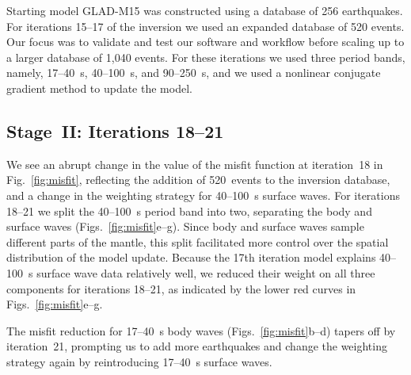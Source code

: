 \documentclass[extra,mreferee]{gji}
\begin{document}
Starting model GLAD-M15 was constructed using a database of 256 earthquakes.
For iterations 15--17 of the inversion we used an expanded database of 520 events.
Our focus was to validate and test our software and workflow before scaling up
to a larger database of 1,040 events.
For these iterations we used three period bands, namely,
17--40~s, 40--100~s, and 90--250~s,
and we used a nonlinear conjugate
gradient method to update the model.

\subsection{Stage~II: Iterations 18--21}

We see an abrupt change in the value of the misfit function at iteration~18
in Fig.~\ref{fig:misfit},
reflecting the addition of 520~events to the inversion database,
and a change in the weighting strategy for 40--100~s surface waves.
For iterations 18--21 we split the 40--100~s period band into two, separating the
body and surface waves (Figs.~\ref{fig:misfit}e--g).
Since body and surface waves sample different parts of the mantle,
this split facilitated more control over the spatial distribution of the model update.
Because the 17th iteration model explains 40--100~s surface wave data relatively well,
we reduced their weight on all three components for iterations 18--21,
as indicated by the lower red curves in Figs.~\ref{fig:misfit}e--g.

The misfit reduction for 17--40~s body waves (Figs.~\ref{fig:misfit}b--d) tapers off by
iteration~21, prompting us to add more earthquakes and change the weighting strategy again by reintroducing 17--40~s surface waves.


\end{document}
